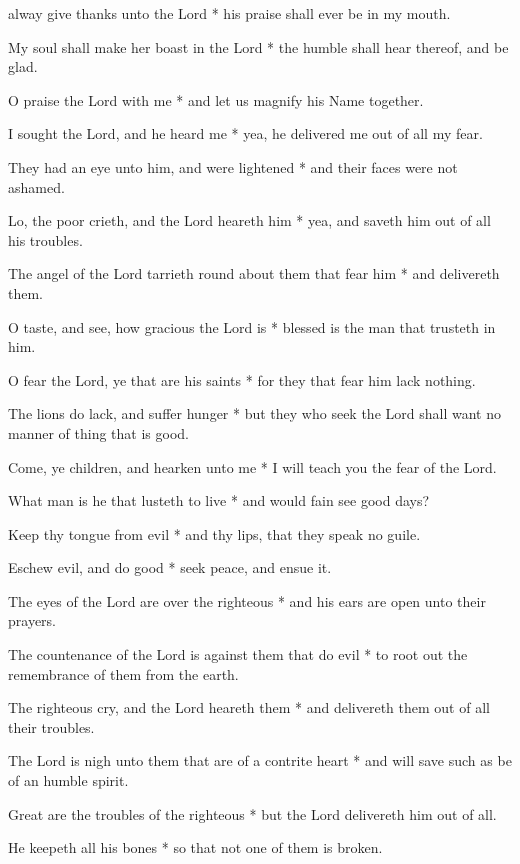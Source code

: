 
 alway give thanks unto the Lord * his praise shall ever be in my mouth.

My soul shall make her boast in the Lord * the humble shall hear thereof, and be glad.

O praise the Lord with me * and let us magnify his Name together.

I sought the Lord, and he heard me * yea, he delivered me out of all my fear.

They had an eye unto him, and were lightened * and their faces were not ashamed.

Lo, the poor crieth, and the Lord heareth him * yea, and saveth him out of all his troubles.

The angel of the Lord tarrieth round about them that fear him * and delivereth them.

O taste, and see, how gracious the Lord is * blessed is the man that trusteth in him.

O fear the Lord, ye that are his saints * for they that fear him lack nothing.

The lions do lack, and suffer hunger * but they who seek the Lord shall want no manner of thing that is good.

Come, ye children, and hearken unto me * I will teach you the fear of the Lord.

What man is he that lusteth to live * and would fain see good days?

Keep thy tongue from evil * and thy lips, that they speak no guile.

Eschew evil, and do good * seek peace, and ensue it.

The eyes of the Lord are over the righteous * and his ears are open unto their prayers.

The countenance of the Lord is against them that do evil * to root out the remembrance of them from the earth.

The righteous cry, and the Lord heareth them * and delivereth them out of all their troubles.

The Lord is nigh unto them that are of a contrite heart * and will save such as be of an humble spirit.

Great are the troubles of the righteous * but the Lord delivereth him out of all.

He keepeth all his bones * so that not one of them is broken.

